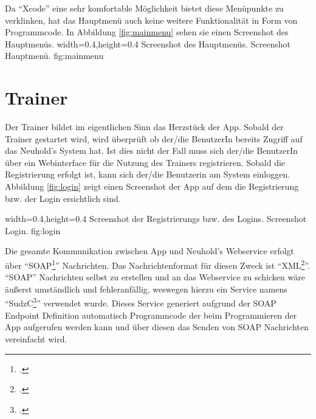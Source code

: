 Da \enquote{Xcode} eine sehr komfortable Möglichkeit bietet diese Menüpunkte
zu verklinken, hat das Hauptmenü auch keine weitere Funktionalität in Form von Programmcode. 
In Abbildung \ref{fig:mainmenu} sehen sie einen Screenshot des Hauptmenüs. 
  {width=0.4\textwidth,height=0.4\textheight}%
  {Screenshot des Hauptmenüs.}%
  {Screenshot Hauptmenü.}%
  {fig:mainmenu}%

\section{Trainer}
\label{subsec:trainer}
Der Trainer bildet im eigentlichen Sinn das Herzstück der App. Sobald der Trainer gestartet wird, 
wird überprüft ob der/die BenutzerIn bereits Zugriff auf das Neuhold's System hat. Ist dies nicht der Fall
muss sich der/die BenutzerIn über ein Webinterface für die Nutzung des Trainers registrieren. Sobald
die Registrierung erfolgt ist, kann sich der/die Benutzerin am System einloggen. Abbildung \ref{fig:login}
zeigt einen Screenshot der App auf dem die Registrierung bzw. der Login ersichtlich sind.

  {width=0.4\textwidth,height=0.4\textheight}%
  {Screenshot der Registrierungs bzw. des Logins.}%
  {Screenshot Login.}%
  {fig:login}%
  
Die gesamte Kommunikation zwischen App und Neuhold's Webservice erfolgt über \enquote{SOAP\footcite{http://www.w3.org/TR/soap9/}} Nachrichten.
Das Nachrichtenformat für diesen Zweck ist \enquote{XML\footcite{http://www.w3.org/XML/}}. \enquote{SOAP} Nachrichten
selbst zu erstellen und an das Webservice zu schicken wäre äußerst umständlich und fehleranfällig, weswegen
hierzu ein Service namens \enquote{SudzC\footcite{http://sudzc.com}} verwendet wurde. 
Dieses Service generiert aufgrund der SOAP Endpoint Definition automatisch Programmcode der beim 
Programmieren der App aufgerufen werden kann und über diesen das Senden von SOAP Nachrichten 
vereinfacht wird.

